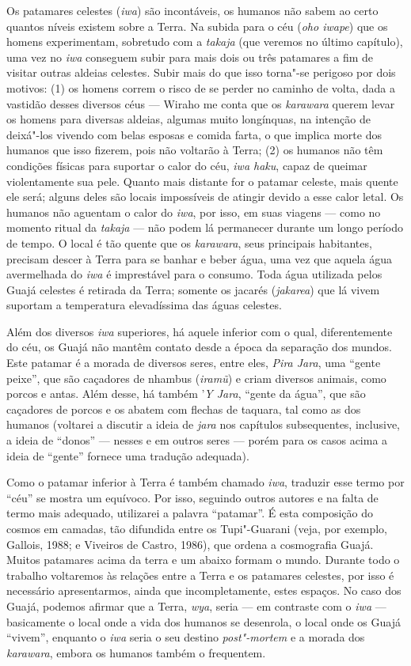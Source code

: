 Os patamares celestes (\emph{iwa}) são incontáveis, os humanos não sabem
ao certo quantos níveis existem sobre a Terra. Na subida para o céu
(\emph{oho iwape}) que os homens experimentam, sobretudo com a
\emph{takaja} (que veremos no último capítulo), uma vez no \emph{iwa}
conseguem subir para mais dois ou três patamares a fim de visitar outras
aldeias celestes. Subir mais do que isso torna"-se perigoso por dois
motivos: (1) os homens correm o risco de se perder no caminho de volta,
dada a vastidão desses diversos céus --- Wiraho me conta que os
\emph{karawara} querem levar os homens para diversas aldeias, algumas
muito longínquas, na intenção de deixá"-los vivendo com belas esposas e
comida farta, o que implica morte dos humanos que isso fizerem, pois não
voltarão à Terra; (2) os humanos não têm condições físicas para suportar
o calor do céu, \emph{iwa haku}, capaz de queimar violentamente sua
pele. Quanto mais distante for o patamar celeste, mais quente ele será;
alguns deles são locais impossíveis de atingir devido a esse calor
letal. Os humanos não aguentam o calor do \emph{iwa}, por isso, em suas
viagens --- como no momento ritual da \emph{takaja} --- não podem lá
permanecer durante um longo período de tempo. O local é tão quente que
os \emph{karawara}, seus principais habitantes, precisam descer à Terra
para se banhar e beber água, uma vez que aquela água avermelhada do
\emph{iwa} é imprestável para o consumo. Toda água utilizada pelos Guajá
celestes é retirada da Terra; somente os jacarés (\emph{jakarea}) que lá
vivem suportam a temperatura elevadíssima das águas celestes.

Além dos diversos \emph{iwa} superiores, há aquele inferior com o qual,
diferentemente do céu, os Guajá não mantêm contato desde a época da
separação dos mundos. Este patamar é a morada de diversos seres, entre
eles, \emph{Pira Jara}, uma ``gente peixe'', que são caçadores de nhambus
(\emph{iramũ}) e criam diversos animais, como porcos e antas. Além
desse, há também '\emph{Y Jara}, ``gente da água'', que são caçadores de
porcos e os abatem com flechas de taquara, tal como as dos humanos
(voltarei a discutir a ideia de \emph{jara} nos capítulos subsequentes,
inclusive, a ideia de ``donos'' --- nesses e em outros seres --- porém para os
casos acima a ideia de ``gente'' fornece uma tradução adequada).

Como o patamar inferior à Terra é também chamado \emph{iwa}, traduzir
esse termo por ``céu'' se mostra um equívoco. Por isso, seguindo outros
autores e na falta de termo mais adequado, utilizarei a palavra
``patamar''. É esta composição do cosmos em camadas, tão difundida entre
os Tupi"-Guarani (veja, por exemplo, Gallois, 1988; e Viveiros de Castro,
1986), que ordena a cosmografia Guajá. Muitos patamares acima da terra e
um abaixo formam o mundo. Durante todo o trabalho voltaremos às relações
entre a Terra e os patamares celestes, por isso é necessário
apresentarmos, ainda que incompletamente, estes espaços. No caso dos
Guajá, podemos afirmar que a Terra, \emph{wya}, seria --- em contraste com
o \emph{iwa} --- basicamente o local onde a vida dos humanos se desenrola,
o local onde os Guajá ``vivem'', enquanto o \emph{iwa} seria o seu
destino \emph{post"-mortem} e a morada dos \emph{karawara}, embora os
humanos também o frequentem.

